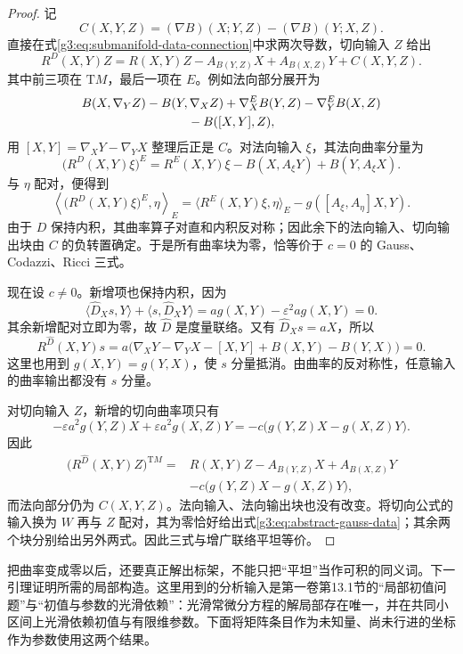 \begin{proof}
	记
	\[
		C(X,Y,Z)=(\nabla B)(X;Y,Z)-(\nabla B)(Y;X,Z).
	\]
	直接在式\eqref{g3:eq:submanifold-data-connection}中求两次导数，切向输入 \(Z\) 给出
	\begin{equation}\label{g3:eq:data-connection-curvature-tangent}
		R^D(X,Y)Z
		=R(X,Y)Z-A_{B(Y,Z)}X+A_{B(X,Z)}Y+C(X,Y,Z).
	\end{equation}
	其中前三项在 \(\mathrm TM\)，最后一项在 \(E\)。例如法向部分展开为
	\[
		\begin{aligned}
		&B(X,\nabla_YZ)-B(Y,\nabla_XZ)
		+\nabla^E_XB(Y,Z)-\nabla^E_YB(X,Z)\\
		&\hspace{30mm}-B([X,Y],Z),
		\end{aligned}
	\]
	用 \([X,Y]=\nabla_XY-\nabla_YX\) 整理后正是 \(C\)。对法向输入 \(\xi\)，其法向曲率分量为
	\[
		\bigl(R^D(X,Y)\xi\bigr)^E
		=R^E(X,Y)\xi-B(X,A_\xi Y)+B(Y,A_\xi X).
	\]
	与 \(\eta\) 配对，便得到
	\[
		\left\langle\bigl(R^D(X,Y)\xi\bigr)^E,\eta\right\rangle_E
		=\langle R^E(X,Y)\xi,\eta\rangle_E-g([A_\xi,A_\eta]X,Y).
	\]
	由于 \(D\) 保持内积，其曲率算子对直和内积反对称；因此余下的法向输入、切向输出块由 \(C\) 的负转置确定。于是所有曲率块为零，恰等价于 \(c=0\) 的 Gauss、Codazzi、Ricci 三式。

	现在设 \(c\ne0\)。新增项也保持内积，因为
	\[
		\langle\widehat D_Xs,Y\rangle
		+\langle s,\widehat D_XY\rangle
		=a g(X,Y)-\varepsilon^2a g(X,Y)=0.
	\]
	其余新增配对立即为零，故 \(\widehat D\) 是度量联络。又有 \(\widehat D_Xs=aX\)，所以
	\[
		R^{\widehat D}(X,Y)s
		=a\bigl(\nabla_XY-\nabla_YX-[X,Y]+B(X,Y)-B(Y,X)\bigr)=0.
	\]
	这里也用到 \(g(X,Y)=g(Y,X)\)，使 \(s\) 分量抵消。由曲率的反对称性，任意输入的曲率输出都没有 \(s\) 分量。

	对切向输入 \(Z\)，新增的切向曲率项只有
	\[
		-\varepsilon a^2g(Y,Z)X+\varepsilon a^2g(X,Z)Y
		=-c\bigl(g(Y,Z)X-g(X,Z)Y\bigr).
	\]
	因此
	\[
		\begin{aligned}
		\bigl(R^{\widehat D}(X,Y)Z\bigr)^{\mathrm TM}
		={}&R(X,Y)Z-A_{B(Y,Z)}X+A_{B(X,Z)}Y\\
		&-c\bigl(g(Y,Z)X-g(X,Z)Y\bigr),
		\end{aligned}
	\]
	而法向部分仍为 \(C(X,Y,Z)\)。法向输入、法向输出块也没有改变。将切向公式的输入换为 \(W\) 再与 \(Z\) 配对，其为零恰好给出式\eqref{g3:eq:abstract-gauss-data}；其余两个块分别给出另外两式。因此三式与增广联络平坦等价。
\end{proof}

把曲率变成零以后，还要真正解出标架，不能只把“平坦”当作可积的同义词。下一引理证明所需的局部构造。这里用到的分析输入是第一卷第13.1节的“局部初值问题”与“初值与参数的光滑依赖”：光滑常微分方程的解局部存在唯一，并在共同小区间上光滑依赖初值与有限维参数。下面将矩阵条目作为未知量、尚未行进的坐标作为参数使用这两个结果。

